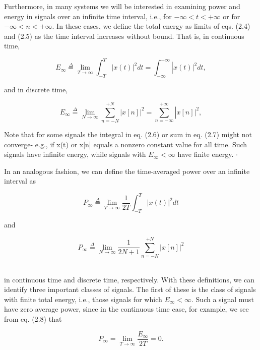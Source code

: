 \documentclass{report}
\begin{document}
Furthermore, in many systems we will be interested in examining power and energy in signals over an infinite time interval, i.e., for \(-\infty <t<+\infty\)
or for \(-\infty <n<+\infty\). In these cases, we define the total energy as limits of eqs. (2.4) and (2.5) as the time interval increases without
bound. That is, in continuous time,

\begin{equation}
E_{\infty }\overset{\Delta }{=}\lim_{T\to  \infty } \int _{-T}^T|x(t)|^2dt=\int _{-\infty }^{+\infty }\left|x(t)|^2dt\right.,
\end{equation}

and in discrete time,

\begin{equation}
E_{\infty }\overset{\Delta }{=}\lim_{N\to \infty } \sum _{n=-N}^{+N} |x[n]|^2=\sum _{n=-\infty }^{+\infty } \left|x[n]|^2\right.,
\end{equation}

Note that for some signals the integral in eq. (2.6) or sum in eq. (2.7) might not converge- e.g., if x(t) or x[n] equals a nonzero constant value
for all time. Such signals have infinite energy, while signals with \(E_{\infty }<\infty\) have finite energy. $\cdot $

In an analogous fashion, we can define the time-averaged power over an infinite interval as

\begin{equation}
P_{\infty }\overset{\Delta }{=}\lim_{T\to \infty } \frac{1}{2T}\int _{-T}^T|x(t)|^2dt
\end{equation}

and

\begin{equation}
P_{\infty }\overset{\Delta }{=}\lim_{N\to \infty } \frac{1}{2N+1}\sum _{n=-N}^{+N} |x[n]|^2
\end{equation}

\\
in continuous time and discrete time, respectively. With these definitions, we can identify three important classes of signals. The first of these
is the class of signals with finite total energy, i.e., those signals for which \(E_{\infty }<\infty\). Such a signal must have zero average power,
since in the continuous time case, for example, we see from eq. (2.8) that

\begin{equation}
P_{\infty }=\lim_{T\to \infty } \frac{E_{\infty }}{2T}=0.
\end{equation}
\end{document}

